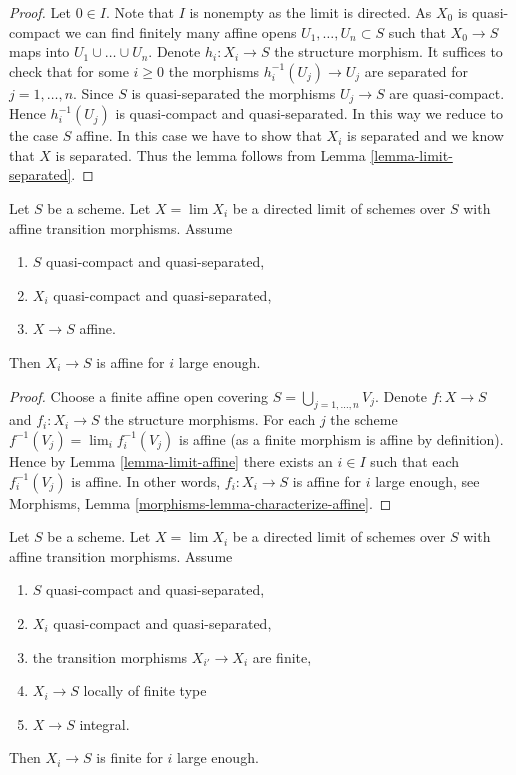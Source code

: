 \begin{proof}
Let $0 \in I$. Note that $I$ is nonempty as the limit is directed.
As $X_0$ is quasi-compact we can find finitely many
affine opens $U_1, \ldots, U_n \subset S$ such that
$X_0 \to S$ maps into $U_1 \cup \ldots \cup U_n$.
Denote $h_i : X_i \to S$ the structure morphism.
It suffices to check that for some $i \geq 0$ the morphisms
$h_i^{-1}(U_j) \to U_j$ are separated for $j = 1, \ldots,  n$.
Since $S$ is quasi-separated the morphisms $U_j \to S$ are quasi-compact.
Hence $h_i^{-1}(U_j)$ is quasi-compact and quasi-separated.
In this way we reduce to the case $S$ affine. In this case we
have to show that $X_i$ is separated and we know that $X$ is separated.
Thus the lemma follows from Lemma \ref{lemma-limit-separated}.
\end{proof}

\begin{lemma}
\label{lemma-eventually-affine}
Let $S$ be a scheme. Let $X = \lim X_i$ be a directed limit of schemes
over $S$ with affine transition morphisms. Assume
\begin{enumerate}
\item $S$ quasi-compact and quasi-separated,
\item $X_i$ quasi-compact and quasi-separated,
\item $X \to S$ affine.
\end{enumerate}
Then $X_i \to S$ is affine for $i$ large enough.
\end{lemma}

\begin{proof}
Choose a finite affine open covering $S = \bigcup_{j = 1, \ldots, n} V_j$.
Denote $f : X \to S$ and $f_i : X_i \to S$ the structure morphisms.
For each $j$ the scheme $f^{-1}(V_j) = \lim_i f_i^{-1}(V_j)$
is affine (as a finite morphism is affine by definition). Hence by
Lemma \ref{lemma-limit-affine} there exists an $i \in I$ such that
each $f_i^{-1}(V_j)$ is affine. In other words, $f_i : X_i \to S$ is
affine for $i$ large enough, see
Morphisms, Lemma \ref{morphisms-lemma-characterize-affine}.
\end{proof}

\begin{lemma}
\label{lemma-eventually-finite}
Let $S$ be a scheme. Let $X = \lim X_i$ be a directed limit of schemes
over $S$ with affine transition morphisms. Assume
\begin{enumerate}
\item $S$ quasi-compact and quasi-separated,
\item $X_i$ quasi-compact and quasi-separated,
\item the transition morphisms $X_{i'} \to X_i$ are finite,
\item $X_i \to S$ locally of finite type
\item $X \to S$ integral.
\end{enumerate}
Then $X_i \to S$ is finite for $i$ large enough.
\end{lemma}


